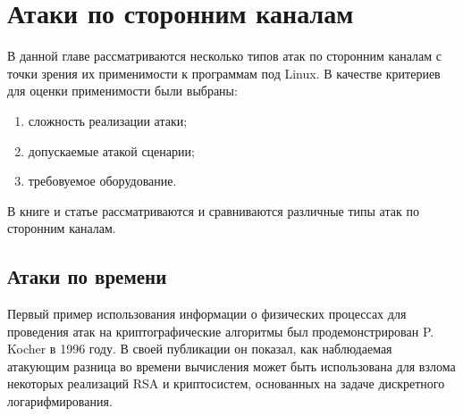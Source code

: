 \section{Атаки по сторонним каналам} \label{sec:sca}

В данной главе рассматриваются несколько типов атак по сторонним каналам с
точки зрения их применимости к программам под Linux. В качестве критериев для
оценки применимости были выбраны:

\begin{enumerate}
\item сложность реализации атаки;
\item допускаемые атакой сценарии;
\item требовуемое оборудование.
\end{enumerate}

В книге \cite{cren} и статье \cite{10years}
рассматриваются и сравниваются различные типы атак по сторонним каналам.



\subsection{Атаки по времени}

Первый пример использования информации о физических процессах для проведения
атак на криптографические алгоритмы был продемонстрирован P. Kocher в 1996 году.
В своей публикации \cite{kocher} он показал, как наблюдаемая атакующим разница
во времени вычисления может быть использована для взлома некоторых реализаций
RSA и криптосистем, основанных на задаче дискретного логарифмирования.

